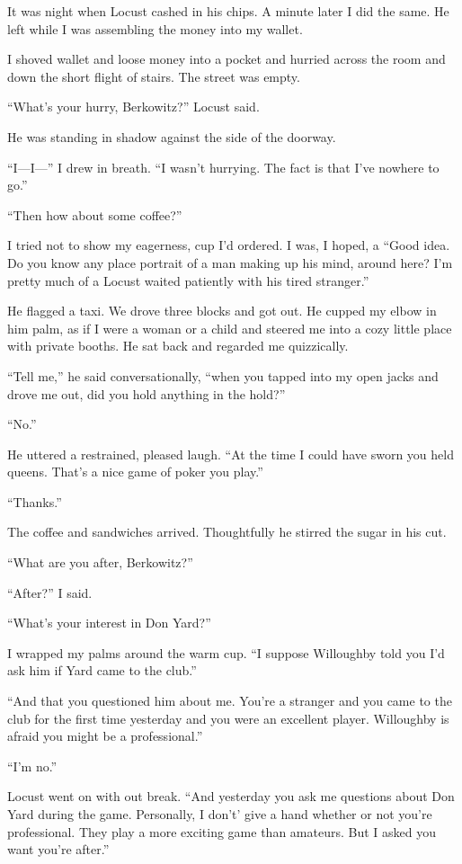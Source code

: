 \documentclass{novel}
\begin{document}
It was night when Locust cashed in his chips. A minute later I did the same. He left while I was assembling the money into my wallet.

I shoved wallet and loose money into a pocket and hurried across the room and down the short flight of stairs. The street was empty.

“What’s your hurry, Berkowitz?” Locust said.

He was standing in shadow against the side of the doorway.

“I—I—” I drew in breath. “I wasn’t hurrying. The fact is that I’ve nowhere to go.”

“Then how about some coffee?”

I tried not to show my eagerness, cup I’d ordered. I was, I hoped, a “Good idea. Do you know any place portrait of a man making up his mind, around here? I’m pretty much of a Locust waited patiently with his tired stranger.”

He flagged a taxi. We drove three blocks and got out. He cupped my elbow in him palm, as if I were a woman or a child and steered me into a cozy little place with private booths. He sat back and regarded me quizzically.

“Tell me,” he said conversationally, “when you tapped into my open jacks and drove me out, did you hold anything in the hold?”

“No.”

He uttered a restrained, pleased laugh. “At the time I could have sworn you held queens. That’s a nice game of poker you play.”

“Thanks.”

The coffee and sandwiches arrived. Thoughtfully he stirred the sugar in his cut. 

“What are you after, Berkowitz?”

“After?” I said.

“What’s your interest in Don Yard?”

I wrapped my palms around the warm cup. “I suppose Willoughby told you I’d ask him if Yard came to the club.”

“And that you questioned him about me. You’re a stranger and you came to the club for the first time yesterday and you were an excellent player. Willoughby is afraid you might be a professional.”

“I’m no.”

Locust went on with out break. “And yesterday you ask me questions about Don Yard during the game. Personally, I don’t’ give a hand whether or not you’re professional. They play a more exciting game than amateurs. But I asked you want you’re after.”
\end{document}
